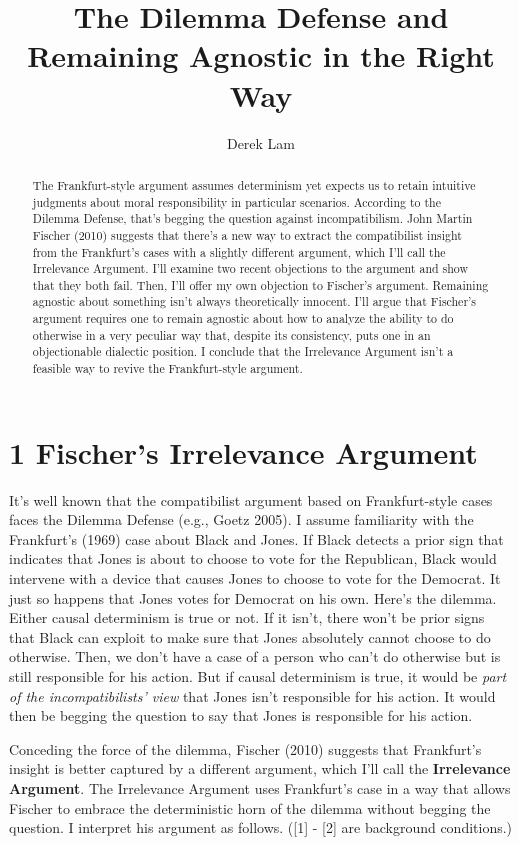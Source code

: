 \documentclass[a4paper,12pt]{article}
\title{\textbf{The Dilemma Defense and Remaining Agnostic in the Right Way}}
\author{Derek Lam}
\begin{document}
\maketitle

\begin{abstract}
The Frankfurt-style argument assumes determinism yet expects us to retain intuitive judgments about moral responsibility in particular scenarios. According to the Dilemma Defense, that's begging the question against incompatibilism. John Martin Fischer (2010) suggests that there's a new way to extract the compatibilist insight from the Frankfurt's cases with a slightly different argument, which I'll call the Irrelevance Argument. I'll examine two recent objections to the argument and show that they both fail. Then, I'll offer my own objection to Fischer's argument. Remaining agnostic about something isn't always theoretically innocent. I'll argue that Fischer's argument requires one to remain agnostic about how to analyze the ability to do otherwise in a very peculiar way that, despite its consistency, puts one in an objectionable dialectic position. I conclude that the Irrelevance Argument isn't a feasible way to revive the Frankfurt-style argument.
\end{abstract}

\section*{1 Fischer's Irrelevance Argument}

It's well known that the compatibilist argument based on Frankfurt-style cases faces the Dilemma Defense (e.g., Goetz 2005). I assume familiarity with the Frankfurt's (1969) case about Black and Jones. If Black detects a prior sign that indicates that Jones is about to choose to vote for the Republican, Black would intervene with a device that causes Jones to choose to vote for the Democrat. It just so happens that Jones votes for Democrat on his own. Here's the dilemma. Either causal determinism is true or not. If it isn't, there won't be prior signs that Black can exploit to make sure that Jones absolutely cannot choose to do otherwise. Then, we don't have a case of a person who can't do otherwise but is still responsible for his action. But if causal determinism is true, it would be \emph{part of the incompatibilists' view} that Jones isn't responsible for his action. It would then be begging the question to say that Jones is responsible for his action.

Conceding the force of the dilemma, Fischer (2010) suggests that Frankfurt's insight is better captured by a different argument, which I'll call the \textbf{Irrelevance Argument}. The Irrelevance Argument uses Frankfurt's case in a way that allows Fischer to embrace the deterministic horn of the dilemma without begging the question. I interpret his argument as follows. ([1] - [2] are background conditions.)
\end{document}
